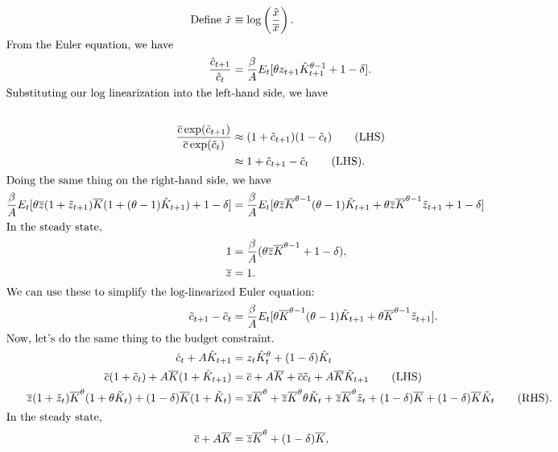 \documentclass[11pt]{article}
\begin{document}
\begin{enumerate}
\begin{align*}
\text{Define } \tilde{x} &\equiv \log\left(\frac{\hat{x}}{\overline{x}}\right).\\
\intertext{From the Euler equation, we have}
\frac{\hat{c}_{t + 1}}{\hat{c}_t} &= \frac{\beta}{A} E_t [\theta z_{t + 1}\hat{K}^{\theta - 1}_{t + 1} + 1 - \delta].\\
\intertext{Substituting our log linearization into the left-hand side, we have}\\
\frac{\overline{c}\exp(\tilde{c}_{t + 1})}{\overline{c} \exp (\tilde{c}_t)} &\approx (1 + \tilde{c}_{t + 1})(1 - \tilde{c}_t)\tag{LHS}\\
&\approx 1 + \tilde{c}_{t + 1} - \tilde{c}_t \tag{LHS}.\\
\intertext{Doing the same thing on the right-hand side, we have}
\frac{\beta}{A} E_t [\theta \overline{z} (1 + \tilde{z}_{t + 1})\overline{K}(1 + (\theta - 1)\hat{K}_{t + 1}) + 1 - \delta] &=
\frac{\beta}{A} E_t [\theta \overline{z} \overline{K}^{\theta - 1}(\theta - 1)\tilde{K}_{t + 1} + \theta \overline{z} \overline{K}^{\theta - 1}\tilde{z}_{t + 1} + 1 - \delta]\\
\intertext{In the steady state,}
1 &= \frac{\beta}{A}(\theta \overline{z} \overline{K}^{\theta - 1} + 1 - \delta),\\
\overline{z} &= 1.\\
\intertext{We can use these to simplify the log-linearized Euler equation:} 
\tilde{c}_{t + 1} - \tilde{c}_t &= \frac{\beta}{A} E_t [\theta \overline{K}^{\theta - 1}(\theta - 1)\tilde{K}_{t + 1} + \theta \overline{K}^{\theta - 1} \tilde{z}_{t + 1}].\\
\intertext{Now, let's do the same thing to the budget constraint.}
\hat{c}_t + A\hat{K}_{t + 1} &= z_t \hat{K}_t^\theta + (1 - \delta)\hat{K}_t \\
\overline{c}(1 + \tilde{c}_t) + A \overline{K} (1 + \hat{K}_{t + 1}) &= \overline{c} + A\overline{K} + \overline{c}\tilde{c}_t + A\overline{K}\tilde{K}_{t + 1}\tag{LHS}\\
\overline{z}(1 + \tilde{z}_t)\overline{K}^\theta (1 + \theta \tilde{K}_t) + (1 - \delta)\overline{K}(1 + \tilde{K}_t) &=
\overline{z} \overline{K}^\theta + \overline{z} \overline{K}^\theta \theta \tilde{K}_t + \overline{z} \overline{K}^\theta \tilde{z}_t + (1 - \delta) \overline{K} + (1 - \delta)\overline{K} \tilde{K}_t \tag{RHS}.\\
\intertext{In the steady state,}
\overline{c} + A \overline{K} &= \overline{z}\overline{K}^\theta + (1 - \delta)\overline{K},\\

\end{align*}
\end{enumerate}
\end{document}
